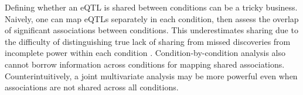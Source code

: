 Defining whether an \gls{eQTL} is shared between conditions can be a tricky business.
Naively, one can map \glspl{eQTL} separately in each condition, then assess the overlap of significant associations between conditions.
This underestimates sharing due to the difficulty of distinguishing true lack of sharing from missed discoveries from incomplete power within each condition \autocite{flutre2013StatisticalFrameworkJoint,peters2016InsightGenotypePhenotypeAssociations}.
Condition-by-condition analysis also cannot borrow information across conditions for mapping shared associations\autocite{flutre2013StatisticalFrameworkJoint,urbut2018FlexibleStatisticalMethods,li2018HTeQTLIntegrativeExpression}.
Counterintuitively, a joint multivariate analysis may be more powerful even when associations are not shared across all conditions\autocite{stephens2013UnifiedFrameworkAssociation}.

